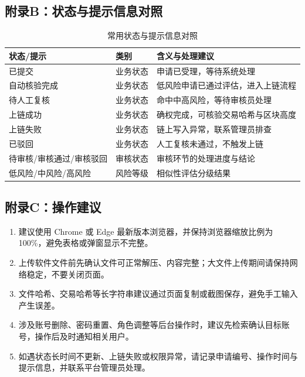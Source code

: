 \documentclass[UTF8,a4paper,12pt]{ctexart}
\begin{document}
\subsection{附录B：状态与提示信息对照}
\begin{table}[H]
  \centering
  \caption{常用状态与提示信息对照}
  \begin{tabularx}{0.96\textwidth}{p{} p{} Y}
    \toprule
    状态/提示 & 类别 & 含义与处理建议 \\
    \midrule
    已提交 & 业务状态 & 申请已受理，等待系统处理 \\
    自动核验完成 & 业务状态 & 低风险申请已通过评估，进入上链流程 \\
    待人工复核 & 业务状态 & 命中中高风险，等待审核员处理 \\
    上链成功 & 业务状态 & 确权完成，可核验交易哈希与区块高度 \\
    上链失败 & 业务状态 & 链上写入异常，联系管理员排查 \\
    已驳回 & 业务状态 & 人工复核未通过，不触发上链 \\
    待审核/审核通过/审核驳回 & 审核状态 & 审核环节的处理进度与结论 \\
    低风险/中风险/高风险 & 风险等级 & 相似性评估分级结果 \\
    \bottomrule
  \end{tabularx}
\end{table}


\subsection{附录C：操作建议}
\begin{enumerate}
  \item 建议使用 Chrome 或 Edge 最新版本浏览器，并保持浏览器缩放比例为 100\%，避免表格或弹窗显示不完整。
  \item 上传软件文件前先确认文件可正常解压、内容完整；大文件上传期间请保持网络稳定，不要关闭页面。
  \item 文件哈希、交易哈希等长字符串建议通过页面复制或截图保存，避免手工输入产生误差。
  \item 涉及账号删除、密码重置、角色调整等后台操作时，建议先检索确认目标账号，操作后及时通知相关用户。
  \item 如遇状态长时间不更新、上链失败或权限异常，请记录申请编号、操作时间与提示信息，并联系平台管理员处理。
\end{enumerate}
\end{document}
